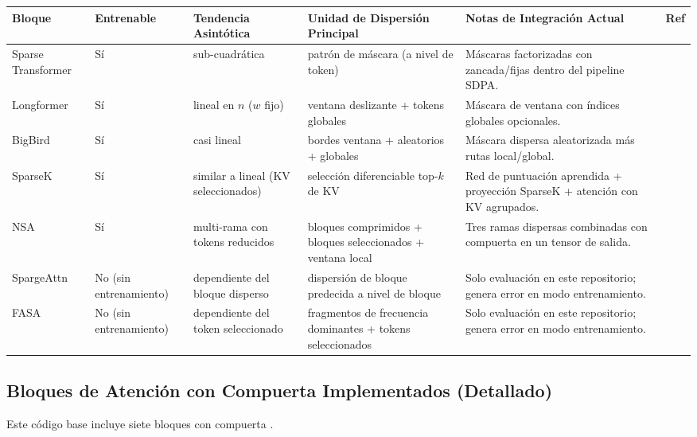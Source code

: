 \documentclass[11pt,a4paper]{article}
\begin{document}
\small
\begin{longtable}{p{2.5cm}p{1.6cm}p{1.9cm}p{2.4cm}p{4.1cm}p{1.5cm}}
\toprule
\textbf{Bloque} & \textbf{Entrenable} & \textbf{Tendencia Asintótica} & \textbf{Unidad de Dispersión Principal} & \textbf{Notas de Integración Actual} & \textbf{Ref} \\
\midrule
\endhead
Sparse Transformer & Sí & sub-cuadrática & patrón de máscara (a nivel de token) & Máscaras factorizadas con zancada/fijas dentro del pipeline SDPA. & \citep{child_sparse_transformer_2019} \\
Longformer & Sí & lineal en $n$ ($w$ fijo) & ventana deslizante + tokens globales & Máscara de ventana con índices globales opcionales. & \citep{beltagy_longformer_2020} \\
BigBird & Sí & casi lineal & bordes ventana + aleatorios + globales & Máscara dispersa aleatorizada más rutas local/global. & \citep{zaheer_bigbird_2020} \\
SparseK & Sí & similar a lineal (KV seleccionados) & selección diferenciable top-$k$ de KV & Red de puntuación aprendida + proyección SparseK + atención con KV agrupados. & \citep{lou_sparsek_2024} \\
NSA & Sí & multi-rama con tokens reducidos & bloques comprimidos + bloques seleccionados + ventana local & Tres ramas dispersas combinadas con compuerta en un tensor de salida. & \citep{yuan_nsa_2025} \\
SpargeAttn & No (sin entrenamiento) & dependiente del bloque disperso & dispersión de bloque predecida a nivel de bloque & Solo evaluación en este repositorio; genera error en modo entrenamiento. & \citep{zhang_spargeattn_2025} \\
FASA & No (sin entrenamiento) & dependiente del token seleccionado & fragmentos de frecuencia dominantes + tokens seleccionados & Solo evaluación en este repositorio; genera error en modo entrenamiento. & \citep{wang_fasa_2026} \\
\bottomrule
\end{longtable}
\normalsize

\subsection{Bloques de Atención con Compuerta Implementados (Detallado)}
Este código base incluye siete bloques con compuerta \citep{yang_gla_2023,yang_deltanet_2024,yang_gated_deltanet_2024,sun_retentive_2023,qin_hgrn2_2024,lin_forgetting_transformer_2025,qiu_gated_attention_2025}.
\end{document}
